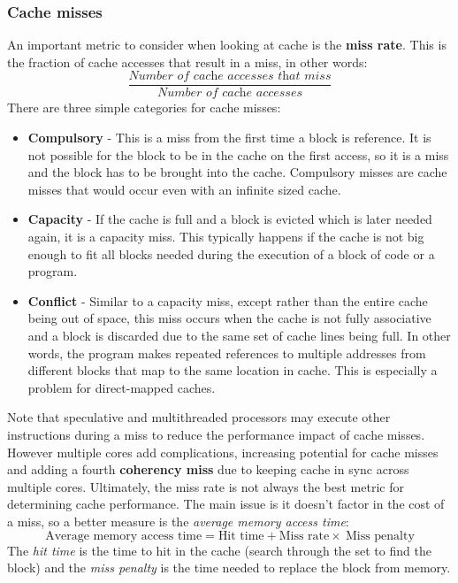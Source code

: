 \documentclass[11pt]{article}
\begin{document}
\subsubsection{Cache misses}
An important metric to consider when looking at cache is the \textbf{miss rate}. This is the fraction of cache accesses that result in a miss, in other words:
\begin{equation*}
\frac{\textit{Number of cache accesses that miss}}{\textit{Number of cache accesses}}
\end{equation*}
There are three simple categories for cache misses:
\begin{itemize}
\item \textbf{Compulsory} - This is a miss from the first time a block is reference. It is not possible for the block to be in the cache on the first access, so it is a miss and the block has to be brought into the cache. Compulsory misses are cache misses that would occur even with an infinite sized cache.
\item \textbf{Capacity} - If the cache is full and a block is evicted which is later needed again, it is a capacity miss. This typically happens if the cache is not big enough to fit all blocks needed during the execution of a block of code or a program.
\item \textbf{Conflict} - Similar to a capacity miss, except rather than the entire cache being out of space, this miss occurs when the cache is not fully associative and a block is discarded due to the same set of cache lines being full. In other words, the program makes repeated references to multiple addresses from different blocks that map to the same location in cache. This is especially a problem for direct-mapped caches.
\end{itemize}
Note that speculative and multithreaded processors may execute other instructions during a miss to reduce the performance impact of cache misses. However multiple cores add complications, increasing potential for cache misses and adding a fourth \textbf{coherency miss} due to keeping cache in sync across multiple cores.
\n
Ultimately, the miss rate is not always the best metric for determining cache performance. The main issue is it doesn't factor in the cost of a miss, so a better measure is the \textit{average memory access time}:
\begin{equation*}
\text{Average memory access time} = \text{Hit time} + \text{Miss rate} \times\ \text{Miss penalty}
\end{equation*}
\noindent
The \textit{hit time} is the time to hit in the cache (search through the set to find the block) and the \textit{miss penalty} is the time needed to replace the block from memory. 
\end{document}
